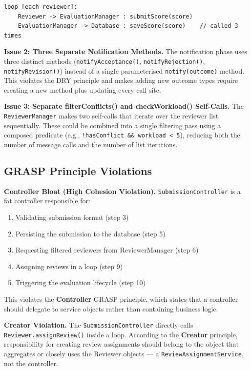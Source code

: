 \documentclass[12pt, a4paper]{article}
\begin{document}
\begin{lstlisting}[style=outputstyle]
loop [each reviewer]:
    Reviewer -> EvaluationManager : submitScore(score)
    EvaluationManager -> Database : saveScore(score)    // called 3 times
\end{lstlisting}

\textbf{Issue 2: Three Separate Notification Methods.}
The notification phase uses three distinct methods (\texttt{notifyAcceptance()}, \texttt{notifyRejection()}, \texttt{notifyRevision()}) instead of a single parameterised \texttt{notify(outcome)} method. This violates the DRY principle and makes adding new outcome types require creating a new method plus updating every call site.

\textbf{Issue 3: Separate filterConflicts() and checkWorkload() Self-Calls.}
The \texttt{ReviewerManager} makes two self-calls that iterate over the reviewer list sequentially. These could be combined into a single filtering pass using a composed predicate (e.g., \texttt{!hasConflict \&\& workload < 5}), reducing both the number of message calls and the number of list iterations.

\subsection{GRASP Principle Violations}

\textbf{Controller Bloat (High Cohesion Violation).}
\texttt{SubmissionController} is a fat controller responsible for:
\begin{enumerate}[nosep]
    \item Validating submission format (step 3)
    \item Persisting the submission to the database (step 5)
    \item Requesting filtered reviewers from ReviewerManager (step 6)
    \item Assigning reviews in a loop (step 9)
    \item Triggering the evaluation lifecycle (step 10)
\end{enumerate}
This violates the \textbf{Controller} GRASP principle, which states that a controller should delegate to service objects rather than containing business logic.

\textbf{Creator Violation.}
The \texttt{SubmissionController} directly calls \texttt{Reviewer.assignReview()} inside a loop. According to the \textbf{Creator} principle, responsibility for creating review assignments should belong to the object that aggregates or closely uses the Reviewer objects --- a \texttt{ReviewAssignmentService}, not the controller.
\end{document}
